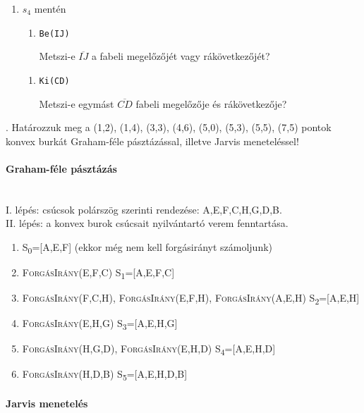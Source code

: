 \documentclass[12pt]{article}
\begin{document}
\begin{enumerate}
\begin{enumerate}
 \end{enumerate}

\item $s_4$ mentén
 \begin{enumerate}
 \item \texttt{Be(IJ)}
 
 Metszi-e $\overline{IJ}$ a fabeli megelőzőjét vagy rákövetkezőjét?
 \end{enumerate}
 
  \begin{enumerate}
  \item \texttt{Ki(CD)}
  
  Metszi-e egymást $\overline{CD}$ fabeli megelőzője és rákövetkezője?
  
  \end{enumerate}
\end{enumerate}

. Határozzuk meg a (1,2), (1,4), (3,3), (4,6), (5,0), (5,3), (5,5), 
(7,5) pontok konvex burkát Graham-féle pásztázással, illetve Jarvis 
meneteléssel!

\paragraph{Graham-féle pásztázás}\mbox{}\\

\noindent I. lépés: csúcsok polárszög szerinti rendezése: A,E,F,C,H,G,D,B. \\
II. lépés: a konvex burok csúcsait nyilvántartó verem fenntartása.
\begin{enumerate}
\item S\textsubscript{0}=[A,E,F] (ekkor még nem kell forgásirányt számoljunk)
\item {\scshape{ForgásIrány(E,F,C)}} S\textsubscript{1}=[A,E,F,C]
\item {\scshape{ForgásIrány(F,C,H)}}, {\scshape{ForgásIrány(E,F,H)}}, 
{\scshape{ForgásIrány(A,E,H)}} S\textsubscript{2}=[A,E,H]
\item {\scshape{ForgásIrány(E,H,G)}} S\textsubscript{3}=[A,E,H,G]
\item {\scshape{ForgásIrány(H,G,D)}}, {\scshape{ForgásIrány(E,H,D)}} 
S\textsubscript{4}=[A,E,H,D]
\item {\scshape{ForgásIrány(H,D,B)}} S\textsubscript{5}=[A,E,H,D,B]
\end{enumerate}

\paragraph{Jarvis menetelés}\mbox{}\\
\end{document}
